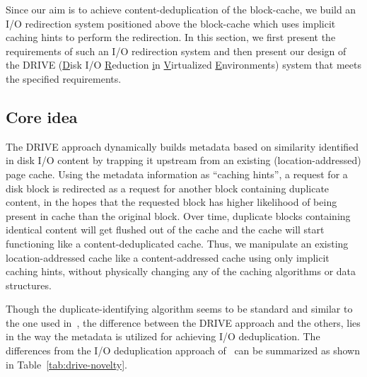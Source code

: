 
Since our aim is to achieve content-deduplication of the block-cache,
we build an I/O redirection system positioned above the block-cache
which uses implicit caching hints to perform the redirection.
In this section, we first present the requirements of such an I/O redirection 
system and then present our design of the DRIVE (\underline{D}isk I/O
\underline{R}eduction \underline{i}n \underline{V}irtualized 
\underline{E}nvironments) system that meets the specified
requirements.

\subsection{Core idea}
The DRIVE approach dynamically builds metadata based on
similarity identified in disk I/O content by trapping it
upstream from an existing (location-addressed) page cache. Using
the metadata information as ``caching hints'', a request
for a disk block is redirected as a request for
another block containing duplicate content, in the hopes
that the requested block has higher likelihood of being
present in cache than the original block. Over time, duplicate
blocks containing identical content will get flushed out
of the cache and the cache will start functioning like a
content-deduplicated cache. Thus, we manipulate an existing
location-addressed cache like a content-addressed cache using only
implicit caching hints, without physically changing any
of the caching algorithms or data structures.

Though the duplicate-identifying algorithm seems to be standard 
and similar to the one used in~\cite{iodedup}, the difference 
between the DRIVE approach and the others, lies in the way the 
metadata is utilized for achieving I/O deduplication. The 
differences from the I/O deduplication approach of~\cite{iodedup} 
can be summarized as shown in Table~\ref{tab:drive-novelty}.

